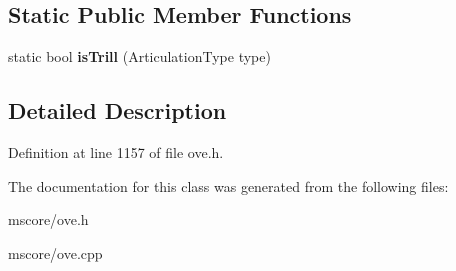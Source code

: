\subsection*{Static Public Member Functions}
\begin{DoxyCompactItemize}
\item 
\mbox{\label{class_o_v_e_1_1_articulation_aeff7a0f324c7e5aebe6d5ba92fe83c37}} 
static bool {\bfseries is\+Trill} (Articulation\+Type type)
\end{DoxyCompactItemize}


\subsection{Detailed Description}


Definition at line 1157 of file ove.\+h.



The documentation for this class was generated from the following files\+:\begin{DoxyCompactItemize}
\item 
mscore/ove.\+h\item 
mscore/ove.\+cpp\end{DoxyCompactItemize}
